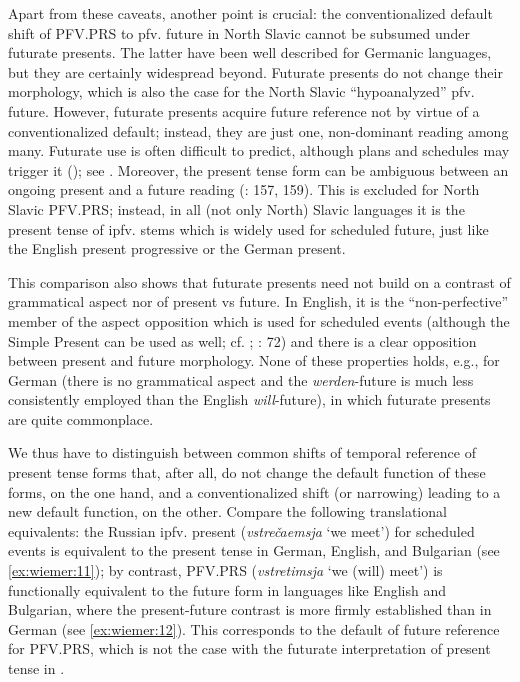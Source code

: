 \documentclass[output=paper,colorlinks,citecolor=brown]{langscibook}
\begin{document}
Apart from these caveats, another point is crucial: the conventionalized default shift of PFV.PRS to pfv. future in North Slavic cannot be subsumed under futurate presents. The latter have been well described for Germanic languages, but they are certainly widespread beyond. Futurate presents do not change their morphology, which is also the case for the North Slavic “hypoanalyzed” pfv. future. However, futurate presents acquire future reference not by virtue of a conventionalized default; instead, they are just one, non-dominant reading among many. Futurate use is often difficult to predict, although plans and schedules may trigger it (\cite{Copley2014}); see . Moreover, the present tense form can be ambiguous between an ongoing present and a future reading (\cite{Hilpert2008}: 157, 159). This is excluded for North Slavic PFV.PRS; instead, in all (not only North) Slavic languages it is the present tense of ipfv. stems which is widely used for scheduled future, just like the English present progressive or the German present. 

This comparison also shows that futurate presents need not build on a contrast of grammatical aspect nor of present vs future. In English, it is the “non-perfective” member of the aspect opposition which is used for scheduled events (although the Simple Present can be used as well; cf. \cite{Copley2008}; \citeyear{Copley2014}: 72) and there is a clear opposition between present and future morphology. None of these properties holds, e.g., for German (there is no grammatical aspect and the \textit{werden}-future is much less consistently employed than the English \textit{will}-future), in which futurate presents are quite commonplace.

We thus have to distinguish between common shifts of temporal reference of present tense forms that, after all, do not change the default function of these forms, on the one hand, and a conventionalized shift (or narrowing) leading to a new default function, on the other. Compare the following translational equivalents: the Russian ipfv. present (\textit{vstrečaemsja} ‘we meet’) for scheduled events is equivalent to the present tense in German, English, and Bulgarian (see \ref{ex:wiemer:11}); by contrast, PFV.PRS (\textit{vstretimsja} ‘we (will) meet’) is functionally equivalent to the future form in languages like English and Bulgarian, where the present-future contrast is more firmly established than in German (see \ref{ex:wiemer:12}). This corresponds to the default of future reference for PFV.PRS, which is not the case with the futurate interpretation of present tense in .
\end{document}
